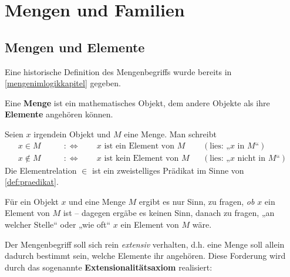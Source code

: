


    
\chapter{Mengen und Familien} \label{chap:mengen}


\section{Mengen und Elemente}


Eine historische Definition des Mengenbegriffs wurde bereits in \cref{mengenimlogikkapitel} gegeben.


\begin{defin}[Menge] \label{def:menge} 
    Eine \textbf{Menge} ist ein mathematisches Objekt, dem andere Objekte als ihre \textbf{Elemente} angehören können.
\end{defin}


\begin{nota}[Elementzeichen]
    Seien $x$ irgendein Objekt und $M$ eine Menge. Man schreibt
    \begin{align*}
        x  \in M \qquad&:\Leftrightarrow\qquad \text{$x$ ist ein Element von $M$} && (\text{lies: „$x$ in $M$“})\\
        x\notin M \qquad &:\Leftrightarrow\qquad \text{$x$ ist kein Element von $M$} && (\text{lies: „$x$ nicht in $M$“})
    \end{align*}
    Die Elementrelation $\in$ ist ein zweistelliges Prädikat im Sinne von \cref{def:praedikat}.

    Für ein Objekt $x$ und eine Menge $M$ ergibt es nur Sinn, zu fragen, \emph{ob} $x$ ein Element von $M$ ist -- dagegen ergäbe es keinen Sinn, danach zu fragen, „an welcher Stelle“ oder „wie oft“ $x$ ein Element von $M$ wäre.
\end{nota}


\noindent Der Mengenbegriff soll sich rein \emph{extensiv} verhalten, d.h. eine Menge soll allein dadurch bestimmt sein, welche Elemente ihr angehören. Diese Forderung wird durch das sogenannte \textbf{Extensionalitätsaxiom} realisiert:


